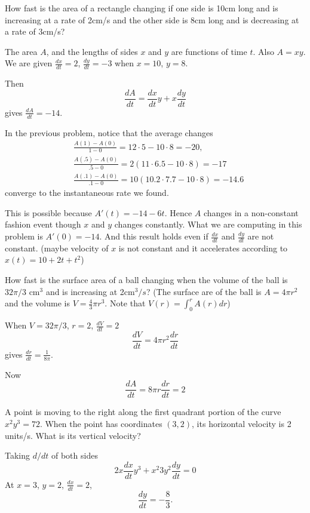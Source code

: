 \documentclass[../calc1-main.tex]{subfiles}
\begin{document}
\begin{example}
  How fast is the area of a rectangle changing if one side is 10cm long and is increasing at a rate of 2cm/s and the other side is 8cm long and is decreasing at a rate of 3cm/s?
\end{example}
\begin{solution}
  The area $A$, and the lengths of sides $x$ and $y$ are functions of time $t$. Also $A = x y$. We are given $\frac{dx}{dt} = 2$, $\frac{dy}{dt} = -3$ when $x=10$, $y=8$.

  Then
  \[
    \frac{dA}{dt} = \frac{dx}{dt} y + x \frac{dy}{dt}
  \]
  gives $\frac{dA}{dt} = -14$.
\end{solution}
In the previous problem, notice that the average changes
\[
  \begin{aligned}
    & \frac{A(1)-A(0)}{1-0} = 12\cdot 5 - 10 \cdot 8 = - 20, \\
    & \frac{A(.5)-A(0)}{.5-0} = 2(11\cdot 6.5 - 10 \cdot 8) = - 17 \\
    & \frac{A(.1)-A(0)}{.1-0} = 10(10.2\cdot 7.7 - 10 \cdot 8) = - 14.6
  \end{aligned}
\]
converge to the instantaneous rate we found.



This is possible because $A'(t) = -14 - 6t$. Hence $A$ changes in a non-constant fashion event though $x$ and $y$ changes constantly. What we are computing in this problem is $A'(0) = - 14$. And this result holds even if $\frac{dx}{dt}$ and $\frac{dy}{dt}$ are not constant. (maybe velocity of $x$ is not constant and it accelerates according to $x(t) = 10 + 2t + t^2$)

\begin{example}
  How fast is the surface area of a ball changing when the volume of the ball is $32 \pi/3$ cm$^3$ and is increasing at 2cm$^3/s$? (The surface are of the ball is $A = 4\pi r^2$ and the volume is $V = \frac{4}{3} \pi r^3$. Note that $V(r) = \int_0^r A(r) dr$)
\end{example}
\begin{solution}
  When $V=32 \pi/3$, $r=2$, $\frac{dV}{dt} = 2$
  \[
    \frac{dV}{dt} = 4 \pi r^2 \frac{dr}{dt}
  \]
  gives $\frac{dr}{dt} = \frac{1}{8 \pi}$.

  Now
  \[
    \frac{dA}{dt} = 8 \pi r \frac{dr}{dt} = 2
  \]
\end{solution}

\begin{example}
  A point is moving to the right along the first quadrant portion of the curve $x^2 y^3 = 72$. When the point has coordinates $(3,2)$, its horizontal velocity is 2 units/s. What is its vertical velocity?
\end{example}
\begin{solution}
  Taking $d/dt$ of both sides
  \[
    2x \frac{dx}{dt} y^3 + x^2 3 y^2 \frac{dy}{dt} = 0
  \]
  At $x=3$, $y=2$, $\frac{dx}{dt} = 2$,
  \[
    \frac{dy}{dt} = - \frac{8}{3}.
  \]

\end{solution}
\end{document}
